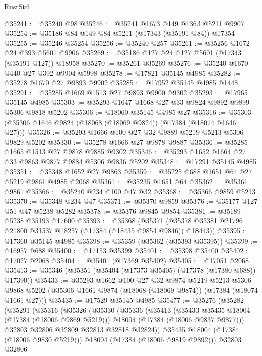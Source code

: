 \begin{lexlean}{RustStd}
\begin{coremodule}
@35241 := @35240 @98
@35246 := @35241 @1673 @149 @1363 @5211 @9907
@35254 := @35186 @84 @149 @84 @5211 (@17343 (@35191 @84)) @17354
@35255 := @35246 @35254
@35256 := @35240 @257
@35261 := @35256 @1672 @24 @393 @5601 @9906
@35269 := @35186 @127 @24 @127 @5601 (@17343 (@35191 @127)) @18958
@35270 := @35261 @35269
@35276 := @35240 @1670 @440 @27 @392 @9904 @5998
@35278 := @17821 @35145 @4985
@35282 := @35278 @1670 @27 @9893 @9902
@35285 := @17952 @35145 @4985 @1448
@35291 := @35285 @1669 @1513 @27 @9893 @9900 @9302
@35293 := @17965 @35145 @4985
@35303 := @35293 @1647 @1668 @27 @33 @9824 @9892 @9899 @5306 @9818 @5202
@35306 := @18060 @35145 @4985 @27
@35316 := @35303 (@35306 @1646 @9824 (@18068 (@18069 @9824)) (@17384 (@18074 @1646 @27)))
@35326 := @35293 @1666 @100 @27 @32 @9889 @5219 @5213 @5306 @9829 @5202
@35330 := @35278 @1666 @27 @9878 @9887
@35336 := @35285 @1665 @1513 @27 @9878 @9885 @9302
@35346 := @35293 @1652 @1664 @27 @33 @9863 @9877 @9884 @5306 @9836 @5202
@35348 := @17291 @35145 @4985
@35351 := @35348 @1652 @27 @9863
@35359 := @35225 @688 @1651 @64 @27 @5219 @9861 @4985 @2068
@35361 := @35235 @1651 @64
@35362 := @35361 @9861
@35366 := @35240 @234 @100 @47 @32
@35368 := @35366 @9859 @5213
@35370 := @35348 @234 @47
@35371 := @35370 @9859
@35376 := @35177 @127 @51 @47 @5238 @5282
@35378 := @35376 @9845 @9854
@35381 := @35189 @5238 @35193 @17600
@35393 := @35368
    (@35371 (@35378 @35381 @21796 @21800 @31537 @18257 (@17384 (@18435 @9854 @9846)) @18443))
@35395 := @17360 @35145 @4985
@35398 := @35359 (@35362 (@35393 @35395))
@35399 := @16957 @688
@35400 := @17153 @35399
@35401 := @35398 @35400
@35402 := @17027 @2068
@35404 := @35401 (@17369 @35402)
@35405 := @17051 @2068
@35413 := @35346 (@35351 (@35404 (@17373 @35405) (@17378 (@17380 @688)) @17390))
@35433 := @35293
    @1662
    @100
    @27
    @32
    @9874
    @5219
    @5213
    @5306
    @9868
    @5202
    (@35306 @1661 @9874 (@18068 (@18069 @9874)) (@17384 (@18074 @1661 @27)))
@35435 := @17529 @35145 @4985
@35477 := @35276
    (@35282
      (@35291
        (@35316
          (@35326
            (@35330
              (@35336
                (@35413
                  (@35433 @35435 @18004 (@17384 (@18006 @9869 @5219)))
                  @18004
                  (@17384 (@18006 @9837 @9877)))
                @32803
                @32806
                @32809
                @32813
                @32818
                @32824))
            @35435
            @18004
            (@17384 (@18006 @9830 @5219)))
          @18004
          (@17384 (@18006 @9819 @9892)))
        @32803
        @32806

\end{coremodule}
\end{lexlean}

